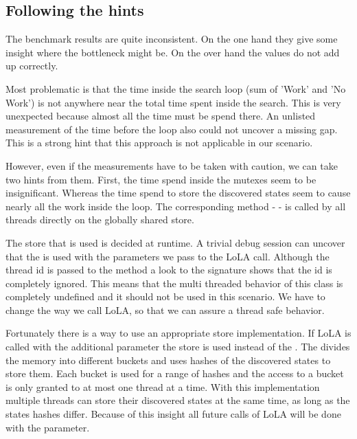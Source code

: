 \subsection{Following the hints}
The benchmark results are quite inconsistent. On the one hand they give some insight where the bottleneck might be. On the over hand the values do not add up correctly.

Most problematic is that the time inside the search loop (sum of 'Work' and 'No Work') is not anywhere near the total time spent inside the search. This is very unexpected because almost all the time must be spend there. An unlisted measurement of the time before the loop also could not uncover a missing gap. This is a strong hint that this approach is not applicable in our scenario.

However, even if the measurements have to be taken with caution, we can take two hints from them. First, the time spend inside the mutexes seem to be insignificant. Whereas the time spend to store the discovered states seem to cause nearly all the work inside the loop. The corresponding method -  - is called by all threads directly on the globally shared store.

The store that is used is decided at runtime. A trivial debug session can uncover that the  is used with the parameters we pass to the LoLA call. Although the thread id is passed to the method a look to the signature  shows that the id is completely ignored. This means that the multi threaded behavior of this class is completely undefined and it should not be used in this scenario. We have to change the way we call LoLA, so that we can assure a thread safe behavior.

Fortunately there is a way to use an appropriate store implementation. If LoLA is called with the additional parameter  the  store is used instead of the . The  divides the memory into different buckets and uses hashes of the discovered states to store them. Each bucket is used for a range of hashes and the access to a bucket is only granted to at most one thread at a time. With this implementation multiple threads can store their discovered states at the same time, as long as the states hashes differ. Because of this insight all future calls of LoLA will be done with the  parameter.

